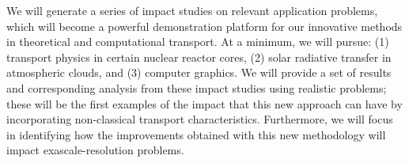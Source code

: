 \documentclass[12pt]{article}
\begin{document}
We will generate a series of impact studies on relevant application problems, which will become a powerful demonstration platform for our innovative methods in theoretical and computational transport.
At a minimum, we will pursue: (1) transport physics in certain nuclear reactor cores, (2) solar radiative transfer in atmospheric clouds, and (3) computer
graphics.
We will provide a set of results and corresponding analysis from these impact studies using realistic problems; these will be the first examples of the impact that this new approach can have by incorporating non-classical transport characteristics.
Furthermore, we will focus in identifying how the improvements obtained with this new methodology will impact exascale-resolution problems.
\end{document}
